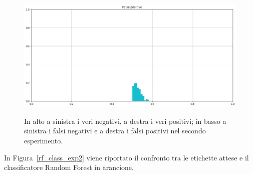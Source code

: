 \documentclass[12pt]{report}
\theoremstyle{definition}
\begin{document}
\begin{figure}
   \begin{minipage}{0.48\textwidth}
     \includegraphics[width=\linewidth]{images/experiment_beta5_disgiunti/fp.png}\label{fp_b5d}
   \end{minipage}
   \caption{In alto a sinistra i veri negativi, a destra i veri positivi; in basso a sinistra i falsi negativi e a destra i falsi positivi nel secondo esperimento.}
   \label{4cases_exp2}
\end{figure}
In Figura~\ref{rf_class_exp2} viene riportato il confronto tra le etichette attese e il classificatore Random Forest in arancione.
\end{document}
